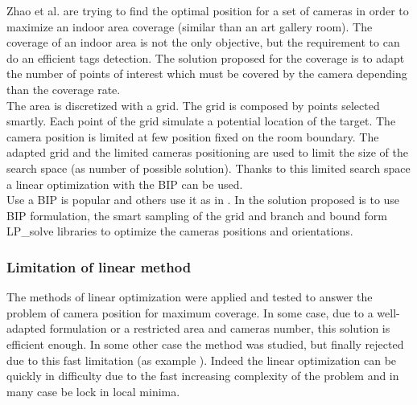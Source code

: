 Zhao  et al. \cite{22*zhao2008} are trying to find the optimal position for a set of cameras in order to maximize an indoor area coverage (similar than an art gallery room). The coverage of an indoor area is not the only objective, but the requirement to can  do an efficient tags detection.
The solution proposed for the coverage is to adapt the number of points of interest which must be covered by the camera depending than the coverage rate. \\
The area is discretized with a grid.  The grid is composed by points selected smartly. Each point of the grid simulate a potential location of the target.
The camera position is limited at few position fixed on the room boundary.
The adapted grid and the limited cameras positioning are used to limit the size of the search space (as number of possible solution). Thanks to this limited search space a linear optimization with the BIP can be used. \\
Use a BIP is popular and others use it as in \cite{22*zhao2008,43*erdem2006}. In \cite{22*zhao2008} the solution proposed is to use BIP formulation, the smart sampling of the grid and branch and bound form LP\_solve libraries to optimize the cameras positions and orientations.


\subsubsection{Limitation of linear method}
The methods of linear optimization were applied and tested to answer the problem of camera position for maximum coverage. In some case, due to a well-adapted formulation or a restricted area and cameras number, this solution is efficient enough. In some other case the method was studied, but finally rejected due to this fast limitation (as example \cite{141*akbarzadeh2013,151*zhao2013,82*chrysostomou2012}). Indeed the linear optimization can be quickly in difficulty due to the fast increasing complexity of the problem and in many case be lock in local minima.

